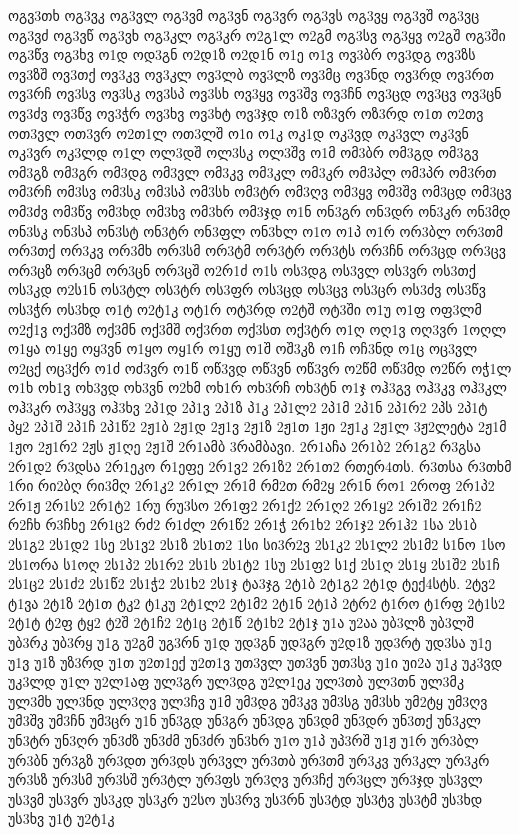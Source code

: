 {ოგვ3თხ
ოგ3ვკ
ოგ3ვლ
ოგ3ვმ
ოგ3ვნ
ოგ3ვრ
ოგ3ვს
ოგ3ვყ
ოგ3ვშ
ოგ3ვც
ოგ3ვძ
ოგ3ვწ
ოგ3ვხ
ოგ3კლ
ოგ3კრ
ო2გ1ლ
ო2გმ
ოგ3სვ
ოგ3ყვ
ო2გშ
ოგ3ში
ოგ3წვ
ოგ3ხვ
ო1დ
ოდ3გნ
ო2დ1ზ
ო2დ1ნ
ო1ე
ო1ვ
ოვ3ბრ
ოვ3დგ
ოვ3ზს
ოვ3ზშ
ოვ3თქ
ოვ3კვ
ოვ3კლ
ოვ3ლბ
ოვ3ლზ
ოვ3მც
ოვ3ნდ
ოვ3რდ
ოვ3რთ
ოვ3რჩ
ოვ3სვ
ოვ3სკ
ოვ3სპ
ოვ3სხ
ოვ3ყვ
ოვ3შვ
ოვ3ჩნ
ოვ3ცდ
ოვ3ცვ
ოვ3ცნ
ოვ3ძვ
ოვ3წვ
ოვ3ჭრ
ოვ3ხვ
ოვ3ხტ
ოვ3ჯდ
ო1ზ
ოზ3ვრ
ოზ3რდ
ო1თ
ო2თვ
ოთ3ვლ
ოთ3ვრ
ო2თ1ლ
ოთ3ლშ
ო1ი
ო1კ
ოკ1დ
ოკ3ვდ
ოკ3ვლ
ოკ3ვნ
ოკ3ვრ
ოკ3ლდ
ო1ლ
ოლ3დშ
ოლ3სკ
ოლ3შვ
ო1მ
ომ3ბრ
ომ3გდ
ომ3გვ
ომ3გზ
ომ3გრ
ომ3დგ
ომ3ვლ
ომ3კვ
ომ3კლ
ომ3კრ
ომ3პლ
ომ3პრ
ომ3რთ
ომ3რჩ
ომ3სვ
ომ3სკ
ომ3სპ
ომ3სხ
ომ3ტრ
ომ3ღვ
ომ3ყვ
ომ3შვ
ომ3ცდ
ომ3ცვ
ომ3ძვ
ომ3წვ
ომ3ხდ
ომ3ხვ
ომ3ხრ
ომ3ჯდ
ო1ნ
ონ3გრ
ონ3დრ
ონ3კრ
ონ3მდ
ონ3სკ
ონ3სპ
ონ3სტ
ონ3ტრ
ონ3ფლ
ონ3ხლ
ო1ო
ო1პ
ო1რ
ორ3ბლ
ორ3თმ
ორ3თქ
ორ3კვ
ორ3მხ
ორ3სმ
ორ3ტმ
ორ3ტრ
ორ3ტს
ორ3ჩნ
ორ3ცდ
ორ3ცვ
ორ3ცზ
ორ3ცმ
ორ3ცნ
ორ3ცშ
ო2რ1ძ
ო1ს
ოს3დგ
ოს3ვლ
ოს3ვრ
ოს3თქ
ოს3კდ
ო2ს1ნ
ოს3ტლ
ოს3ტრ
ოს3ფრ
ოს3ცდ
ოს3ცვ
ოს3ცრ
ოს3ძვ
ოს3წვ
ოს3ჭრ
ოს3ხდ
ო1ტ
ო2ტ1კ
ოტ1რ
ოტ3რდ
ო2ტშ
ოტ3ში
ო1უ
ო1ფ
ოფ3ლმ
ო2ქ1ვ
ოქ3მზ
ოქ3მნ
ოქ3მშ
ოქ3რთ
ოქ3სთ
ოქ3ტრ
ო1ღ
ოღ1ვ
ოღ3ვრ
1ოღლ
ო1ყა
ო1ყე
ოყ3ვნ
ო1ყო
ოყ1რ
ო1ყუ
ო1შ
ოშ3კზ
ო1ჩ
ოჩ3ნდ
ო1ც
ოც3ვლ
ო2ცქ
ოც3ქრ
ო1ძ
ოძ3ვრ
ო1წ
ოწ3ვდ
ოწ3ვნ
ოწ3ვრ
ო2წმ
ოწ3მდ
ო2წრ
ოჭ1ლ
ო1ხ
ოხ1ვ
ოხ3ვდ
ოხ3ვნ
ო2ხმ
ოხ1რ
ოხ3რჩ
ოხ3ტნ
ო1ჯ
ოჰ3გვ
ოჰ3კვ
ოჰ3კლ
ოჰ3კრ
ოჰ3ყვ
ოჰ3ხვ
2პ1დ
2პ1ვ
2პ1ზ
პ1კ
2პ1ლ2
2პ1მ
2პ1ნ
2პ1რ2
2პს
2პ1ტ
პყ2
2პ1შ
2პ1ჩ
2პ1წ2
2ჟ1ბ
2ჟ1დ
2ჟ1ვ
2ჟ1ზ
2ჟ1თ
1ჟი
2ჟ1კ
2ჟ1ლ
3ჟ2ლეტა
2ჟ1მ
1ჟო
2ჟ1რ2
2ჟს
ჟ1ღე
2ჟ1შ
2რ1ამბ
3რამბავი.
2რ1აჩა
2რ1ბ2
2რ1გ2
რ3გსა
2რ1დ2
რ3დსა
2რ1ეკო
რ1ეფე
2რ1ვ2
2რ1ზ2
2რ1თ2
რთერ4თს.
რ3თსა
რ3თხმ
1რი
რი2ბღ
რი3მღ
2რ1კ2
2რ1ლ
2რ1მ
რმ2თ
რმ2ყ
2რ1ნ
რო1
2როფ
2რ1პ2
2რ1ჟ
2რ1ს2
2რ1ტ2
1რუ
რუ3სო
2რ1ფ2
2რ1ქ2
2რ1ღ2
2რ1ყ2
2რ1შ2
2რ1ჩ2
რ2ჩხ
რ3ჩხე
2რ1ც2
რძ2
რ1ძლ
2რ1წ2
2რ1ჭ
2რ1ხ2
2რ1ჯ2
2რ1ჰ2
1სა
2ს1ბ
2ს1გ2
2ს1დ2
1სე
2ს1ვ2
2ს1ზ
2ს1თ2
1სი
სი3რ2ვ
2ს1კ2
2ს1ლ2
2ს1მ2
ს1ნო
1სო
2ს1ორა
ს1ოღ
2ს1პ2
2ს1რ2
2ს1ს
2ს1ტ2
1სუ
2ს1ფ2
ს1ქ
2ს1ღ
2ს1ყ
2ს1შ2
2ს1ჩ
2ს1ც2
2ს1ძ2
2ს1წ2
2ს1ჭ2
2ს1ხ2
2ს1ჯ
ტა3ჯგ
2ტ1ბ
2ტ1გ2
2ტ1დ
ტექ4სტს.
2ტვ2
ტ1ვა
2ტ1ზ
2ტ1თ
ტკ2
ტ1კუ
2ტ1ლ2
2ტ1მ2
2ტ1ნ
2ტ1პ
2ტრ2
ტ1რო
ტ1რფ
2ტ1ს2
2ტ1ტ
ტ2ფ
ტყ2
ტ2შ
2ტ1ჩ2
2ტ1ც
2ტ1წ
2ტ1ხ2
2ტ1ჯ
უ1ა
უ2აა
უბ3ლზ
უბ3ლშ
უბ3რკ
უბ3რყ
უ1გ
უ2გმ
უგ3რნ
უ1დ
უდ3გნ
უდ3გრ
უ2დ1ზ
უდ3რტ
უდ3სა
უ1ე
უ1ვ
უ1ზ
უზ3რდ
უ1თ
უ2თ1ექ
უ2თ1ვ
უთ3ვლ
უთ3ვნ
უთ3სვ
უ1ი
უი2ა
უ1კ
უკ3ვდ
უკ3ლდ
უ1ლ
უ2ლ1აფ
ულ3გრ
ულ3დგ
უ2ლ1ეკ
ულ3თბ
ულ3თნ
ულ3მკ
ულ3მხ
ულ3ნდ
ულ3ღვ
ულ3ჩვ
უ1მ
უმ3დგ
უმ3კვ
უმ3სგ
უმ3სხ
უმ2ტყ
უმ3ღვ
უმ3შვ
უმ3ჩნ
უმ3ცრ
უ1ნ
უნ3გდ
უნ3გრ
უნ3დგ
უნ3დმ
უნ3დრ
უნ3თქ
უნ3კლ
უნ3ტრ
უნ3ღრ
უნ3ძზ
უნ3ძმ
უნ3ძრ
უნ3ხრ
უ1ო
უ1პ
უპ3რშ
უ1ჟ
უ1რ
ურ3ბლ
ურ3ბნ
ურ3გზ
ურ3დთ
ურ3დს
ურ3ვლ
ურ3თბ
ურ3თმ
ურ3კვ
ურ3კლ
ურ3კრ
ურ3სზ
ურ3სმ
ურ3სშ
ურ3ტლ
ურ3ფს
ურ3ღვ
ურ3ჩქ
ურ3ცლ
ურ3ჯდ
უს3ვლ
უს3ვმ
უს3ვრ
უს3კდ
უს3კრ
უ2სო
უს3რვ
უს3რნ
უს3ტდ
უს3ტვ
უს3ტმ
უს3ხდ
უს3ხვ
უ1ტ
უ2ტ1კ
}

